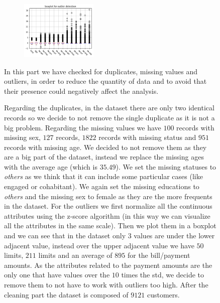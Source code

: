 \begin{figure}[h]
  \begin{minipage}[h]{0.95\textwidth}

\begin{figure}
\centering
\includegraphics[width=0.40\textwidth]{img/ch2/outlier}
\end{figure}

    In this part we have checked for duplicates, missing values and outliers, in order to reduce the quantity of data and to avoid that their presence could negatively affect the analysis.

    Regarding the duplicates, in the dataset there are only two identical records so we decide to not remove the single duplicate as it is not a big problem.
    Regarding the missing values we have $100$ records with missing sex, $127$ records, $1822$ records with missing status and $951$ records with missing age. We decided to not remove them as they are a big part of the dataset, instead we replace the missing ages with the average age (which is $35.49$). We set the missing statuses to \textit{others} as we think that it can include some particular cases (like engaged or cohabitant). We again set the missing educations to \textit{others} and the missing sex to female as they are the more frequents in the dataset. 
    For the outliers we first normalize all the continuous attributes using the z-score algorithm (in this way we can visualize all the attributes in the same scale). Then we plot them in a boxplot and we can see that in the dataset only $3$ values are under the lower adjacent value, instead over the upper adjacent value we have $50$ limits, $211$ limits and an average of $895$ for the bill/payment amounts. As the attributes related to the payment amounts are the only one that have values over the $10$ times the std, we decide to remove them to not have to work with outliers too high. After the cleaning part the dataset is composed of $9121$ customers. 
  \end{minipage}
\end{figure}

